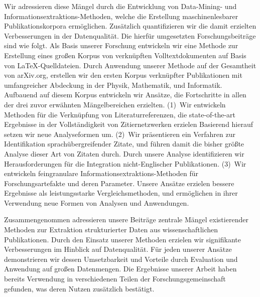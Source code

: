 Wir adressieren diese Mängel durch die Entwicklung von Data-Mining- und In\-for\-ma\-tions\-ex\-trak\-tions-Methoden, welche die Erstellung maschinenlesbarer Publikationskorpora ermöglichen. Zusätzlich quantifizieren wir die damit erzielten Verbesserungen in der Datenqualität.
Die hierfür umgesetzten Forschungsbeiträge sind wie folgt.
Als Basis unserer Forschung entwickeln wir eine Methode zur Erstellung eines großen Korpus von verknüpften Volltextdokumenten auf Basis von \LaTeX-Quelldateien.
Durch Anwendung unserer Methode auf der Gesamtheit von arXiv.org, erstellen wir den ersten Korpus verknüpfter Publikationen mit umfangreicher Abdeckung in der Physik, Mathematik, und Informatik.
Aufbauend auf diesem Korpus entwickeln wir Ansätze, die Fortschritte in allen der drei zuvor erwähnten Mängelbereichen erzielten.
(1)~Wir entwickeln Methoden für die Verknüpfung von Literaturreferenzen, die state-of-the-art Ergebnisse in der Vollständigkeit von Zitiernetzwerken erzielen
Basierend hierauf setzen wir neue Analyseformen um.
(2)~Wir präsentieren ein Verfahren zur Identifikation sprachübergreifender Zitate, und führen damit die bisher größte Analyse dieser Art von Zitaten durch.
Durch unsere Analyse identifizieren wir Herausforderungen für die Integration nicht-Englischer Publikationen.
(3)~Wir entwickeln feingranulare In\-for\-ma\-tions\-ex\-trak\-tions-Methoden für Forschungsartefakte und deren Parameter. Unsere Ansätze erzielen bessere Ergebnisse als leistungsstarke Vergleichsmethoden, und ermöglichen in ihrer Verwendung neue Formen von Analysen und Anwendungen.

Zusammengenommen adressieren unsere Beiträge zentrale Mängel existierender Methoden zur Extraktion strukturierter Daten aus wissenschaftlichen Publikationen.
Durch den Einsatz unserer Methoden erzielen wir signifikante Verbesserungen im Hinblick auf Datenqualität.
Für jeden unserer Ansätze demonstrieren wir dessen Umsetzbarkeit und Vorteile durch Evaluation und Anwendung auf großen Datenmengen.
Die Ergebnisse unserer Arbeit haben bereits Verwendung in verschiedenen Teilen der Forschungsgemeinschaft gefunden, was deren Nutzen zusätzlich bestätigt.
